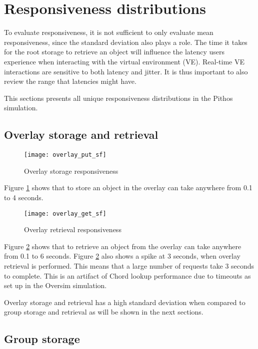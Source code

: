 \section{Responsiveness distributions}

To evaluate responsiveness, it is not sufficient to only evaluate mean responsiveness, since the standard deviation also plays a role. The time it takes for the root storage to retrieve an object will influence the latency users experience when interacting with the virtual environment (VE). Real-time VE interactions are sensitive to both latency and jitter. It is thus important to also review the range that latencies might have.

This sections presents all unique responsiveness distributions in the Pithos simulation.

\subsection{Overlay storage and retrieval}

\begin{figure}[htbp]
 \centering
 \texttt{[image: overlay\_put\_sf]}
 \caption{Overlay storage responsiveness}
 \label{fig_overlay_put_sf}
\end{figure}
%
Figure \ref{fig_overlay_put_sf} shows that to store an object in the overlay can take anywhere from 0.1 to 4 seconds.

\begin{figure}[htbp]
 \centering
 \texttt{[image: overlay\_get\_sf]}
 \caption{Overlay retrieval responsiveness}
 \label{fig_overlay_get_sf}
\end{figure}
%
Figure \ref{fig_overlay_get_sf} shows that to retrieve an object from the overlay can take anywhere from 0.1 to 6 seconds. Figure \ref{fig_overlay_get_sf} also shows a spike at 3 seconds, when overlay retrieval is performed. This means that a large number of requests take 3 seconds to complete. This is an artifact of Chord lookup performance due to timeouts as set up in the Oversim simulation.

Overlay storage and retrieval has a high standard deviation when compared to group storage and retrieval as will be shown in the next sections.


\subsection{Group storage}

